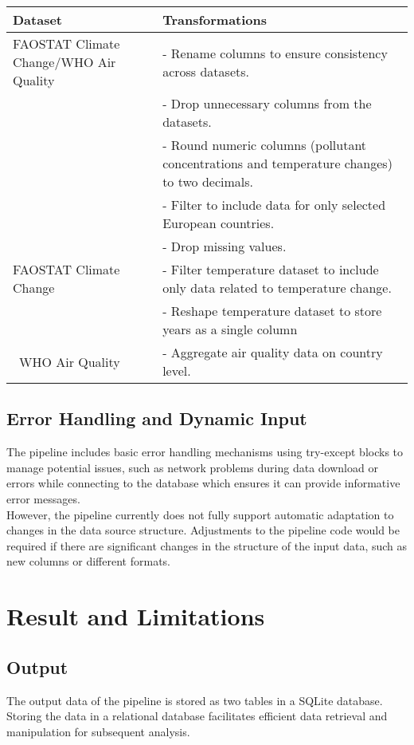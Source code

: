 \documentclass{article}
\begin{document}
\begin{table}[h]
\centering
\begin{tabular}{|p{4cm}|p{11cm}|}
\hline
\textbf{Dataset} & \textbf{Transformations} \\
\hline
\centering FAOSTAT Climate Change/WHO Air Quality & - Rename columns to ensure consistency across datasets.\\
 & - Drop unnecessary columns from the datasets.\\
 & - Round numeric columns (pollutant concentrations and temperature changes) to two decimals.\\
& - Filter to include data for only selected European countries.\\
 & - Drop missing values. \\
\hline
\centering FAOSTAT Climate Change & - Filter temperature dataset to include only data related to temperature change.\\
 & - Reshape temperature dataset to store years as a single column\\
\hline
\centering\ WHO Air Quality 
 & - Aggregate air quality data on country level.\\
\hline
\end{tabular}
\end{table}



\vspace{1em}

\subsection{Error Handling and Dynamic Input}

The pipeline includes basic error handling mechanisms using try-except blocks to manage potential issues, such as network problems during data download or errors while connecting to the database which ensures it can provide informative error messages.\\
However, the pipeline currently does not fully support automatic adaptation to changes in the data source structure. Adjustments to the pipeline code would be required if there are significant changes in the structure of the input data, such as new columns or different formats. 

\section{Result and Limitations}
\subsection{Output}
The output data of the pipeline is stored as two tables in a SQLite database. Storing the data in a relational database facilitates efficient data retrieval and manipulation for subsequent analysis.\\
\end{document}
